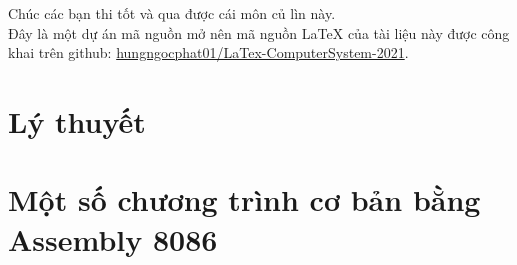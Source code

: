 \documentclass[12pt]{report}
\begin{document}
Chúc các bạn thi tốt và qua được cái môn {\tiny củ lìn} này.\\[1.5cm]

Đây là một dự án mã nguồn mở nên mã nguồn {\LaTeX} của tài liệu này được công khai trên github: \href{https://github.com/hungngocphat01/LaTex-ComputerSystem-2021}{hungngocphat01/LaTex-ComputerSystem-2021}.
\pagebreak

\renewcommand*\contentsname{Mục lục}
\setcounter{tocdepth}{2}
\tableofcontents
\pagebreak

\chapter{Lý thuyết} \label{chapterLyThuyet}
\pagebreak











\chapter{Một số chương trình cơ bản bằng Assembly 8086} \label{chapterBaiTap}



\renewcommand{\bibname}{Tài liệu tham khảo}
\nocite{htmt_lvl}
\nocite{htmt_thv}
\nocite{jbwyatt}


\end{document}
